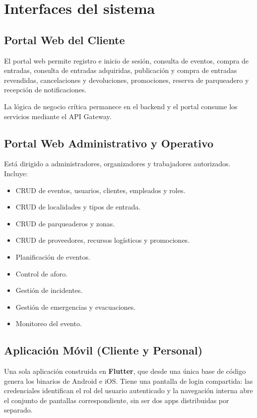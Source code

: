 \documentclass[12pt,a4paper]{article}
\begin{document}
\section{Interfaces del sistema}

\subsection{Portal Web del Cliente}

El portal web permite registro e inicio de sesión, consulta de eventos, compra de entradas, consulta de entradas adquiridas, publicación y compra de entradas revendidas, cancelaciones y devoluciones, promociones, reserva de parqueadero y recepción de notificaciones.

La lógica de negocio crítica permanece en el backend y el portal consume los servicios mediante el API Gateway.

\subsection{Portal Web Administrativo y Operativo}

Está dirigido a administradores, organizadores y trabajadores autorizados. Incluye:

\begin{itemize}
\item CRUD de eventos, usuarios, clientes, empleados y roles.
\item CRUD de localidades y tipos de entrada.
\item CRUD de parqueaderos y zonas.
\item CRUD de proveedores, recursos logísticos y promociones.
\item Planificación de eventos.
\item Control de aforo.
\item Gestión de incidentes.
\item Gestión de emergencias y evacuaciones.
\item Monitoreo del evento.
\end{itemize}

\subsection{Aplicación Móvil (Cliente y Personal)}

Una sola aplicación construida en \textbf{Flutter}, que desde una única base de código genera los
binarios de Android e iOS. Tiene una pantalla de login compartida: las credenciales identifican el rol
del usuario autenticado y la navegación interna abre el conjunto de pantallas correspondiente, sin ser
dos apps distribuidas por separado.
\end{document}
